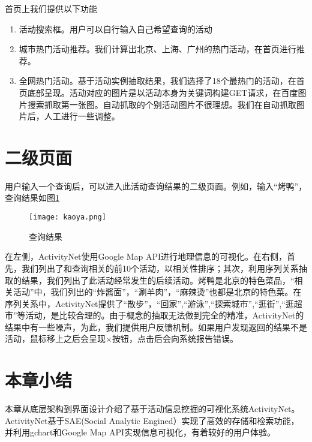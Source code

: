 首页上我们提供以下功能
\begin{enumerate}
\item 活动搜索框。用户可以自行输入自己希望查询的活动
\item 城市热门活动推荐。我们计算出北京、上海、广州的热门活动，在首页进行推荐。
\item 全网热门活动。基于活动实例抽取结果，我们选择了18个最热门的活动，在首页底部呈现。活动对应的图片是以活动本身为关键词构建GET请求，在百度图片搜索抓取第一张图。自动抓取的个别活动图片不很理想。我们在自动抓取图片后，人工进行一些调整。
\end{enumerate}

\section{二级页面}
用户输入一个查询后，可以进入此活动查询结果的二级页面。例如，输入``烤鸭''，查询结果如图\ref{fig:query_kaoya}

\begin{figure}[h]
\centering
\texttt{[image: kaoya.png]}
\caption{查询结果}
\label{fig:query_kaoya}
\end{figure}

在左侧，ActivityNet使用Google Map API进行地理信息的可视化。在右侧，首先，我们列出了和查询相关的前10个活动，以相关性排序；其次，利用序列关系抽取的结果，我们列出了此活动经常发生的后续活动。烤鸭是北京的特色菜品，``相关活动''中，我们列出的``炸酱面''，``涮羊肉''，``麻辣烫''也都是北京的特色菜。在序列关系中，ActivityNet提供了``散步''，``回家'',``游泳'',``探索城市'',``逛街'',``逛超市''等活动，是比较合理的。由于概念的抽取无法做到完全的精准，ActivityNet的结果中有一些噪声，为此，我们提供用户反馈机制。如果用户发现返回的结果不是活动，鼠标移上之后会呈现$\times$按钮，点击后会向系统报告错误。

\section{本章小结}
本章从底层架构到界面设计介绍了基于活动信息挖掘的可视化系统ActivityNet。ActivityNet基于SAE(Social Analytic Engined）实现了高效的存储和检索功能，并利用gchart和Google Map API实现信息可视化，有着较好的用户体验。

